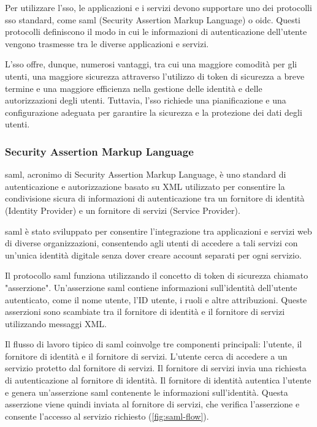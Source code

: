 Per utilizzare l'\acrshort{sso}, le applicazioni e i servizi devono supportare uno dei protocolli \acrshort{sso} standard, come \acrshort{saml} (Security Assertion Markup Language) o \acrshort{oidc}. Questi protocolli definiscono il modo in cui le informazioni di autenticazione dell'utente vengono trasmesse tra le diverse applicazioni e servizi.

L'\acrshort{sso} offre, dunque, numerosi vantaggi, tra cui una maggiore comodità per gli utenti, una maggiore sicurezza attraverso l'utilizzo di token di sicurezza a breve termine e una maggiore efficienza nella gestione delle identità e delle autorizzazioni degli utenti. Tuttavia, l'\acrshort{sso} richiede una pianificazione e una configurazione adeguata per garantire la sicurezza e la protezione dei dati degli utenti.

\subsubsection{Security Assertion Markup Language}

\acrshort{saml}\cite{site:saml}, acronimo di Security Assertion Markup Language, è uno standard di autenticazione e autorizzazione basato su XML utilizzato per consentire la condivisione sicura di informazioni di autenticazione tra un fornitore di identità (Identity Provider) e un fornitore di servizi (Service Provider).

\acrshort{saml} è stato sviluppato per consentire l'integrazione tra applicazioni e servizi web di diverse organizzazioni, consentendo agli utenti di accedere a tali servizi con un'unica identità digitale senza dover creare account separati per ogni servizio.

Il protocollo \acrshort{saml} funziona utilizzando il concetto di token di sicurezza chiamato "asserzione". Un'asserzione \acrshort{saml} contiene informazioni sull'identità dell'utente autenticato, come il nome utente, l'ID utente, i ruoli e altre attribuzioni. Queste asserzioni sono scambiate tra il fornitore di identità e il fornitore di servizi utilizzando messaggi XML.

Il flusso di lavoro tipico di \acrshort{saml} coinvolge tre componenti principali: l'utente, il fornitore di identità e il fornitore di servizi. L'utente cerca di accedere a un servizio protetto dal fornitore di servizi. Il fornitore di servizi invia una richiesta di autenticazione al fornitore di identità. Il fornitore di identità autentica l'utente e genera un'asserzione \acrshort{saml} contenente le informazioni sull'identità. Questa asserzione viene quindi inviata al fornitore di servizi, che verifica l'asserzione e consente l'accesso al servizio richiesto (\autoref{fig:saml-flow}).

